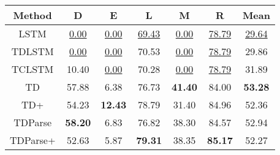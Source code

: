 \begin{tabular}{|c|c|c|c|c|c|c|}
\hline
Method  &   D &  E &  L &  M &  R  &   Mean \\
\hline
LSTM &   \underline{0.00} &      \underline{0.00} &   \underline{69.43} &      \underline{0.00} &       \underline{78.79} &  \underline{29.64} \\
\hline
TDLSTM &   \underline{0.00} &      \underline{0.00} &   70.53 &      \underline{0.00} &       \underline{78.79} &  29.86 \\
\hline
TCLSTM &  10.40 &      \underline{0.00} &   70.28 &      \underline{0.00} &       \underline{78.79} &  31.89 \\
\hline
TD &  57.88 &      6.38 &   76.73 &     \textbf{41.40} &       84.00 &  \textbf{53.28} \\
\hline
TD+ &  54.23 &     \textbf{12.43} &   78.79 &     31.40 &       84.96 &  52.36 \\
\hline
TDParse &  \textbf{58.20} &      6.83 &   76.82 &     38.30 &       84.57 &  52.94 \\
\hline
TDParse+ &  52.63 &      5.87 &   \textbf{79.31} &     38.35 &       \textbf{85.17} &  52.27 \\
\hline
\end{tabular}